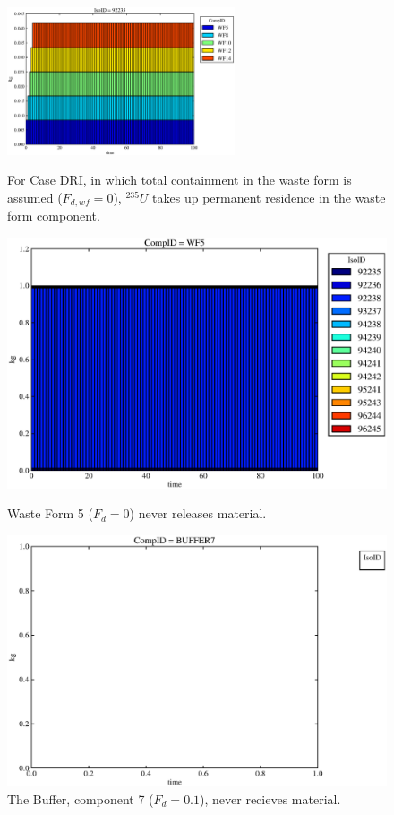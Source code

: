 
\begin{figure}[ht]
\centering
\includegraphics[width=0.6\textwidth]{./chapters/demonstration/base/drI.eps}
\caption[$^{235}U$ residence. Degradation Rate Waste Form No Release.]{
For Case DRI, in which total containment in the waste form is assumed ($F_{d,wf}=0$), 
$^{235}U$ takes up permanent residence in the waste form component.
}
\label{fig:drIall}
\begin{minipage}[b]{0.45\linewidth}

  \includegraphics[width=\textwidth]{./chapters/demonstration/base/drI1.eps}
  \caption[DRI Waste Form Contaminants.]{
    Waste Form 5 ($F_d = 0$) never releases material.
    }
  \label{fig:drIwf5}
  
  \includegraphics[width=\textwidth]{./chapters/demonstration/base/drI3.eps}
  \caption[Case DRI Buffer Contaminants]{
    The Buffer, component 7 ($F_d = 0.1$), never recieves material.
    }
  \label{fig:drIbuff}


\end{minipage}
\end{figure}
